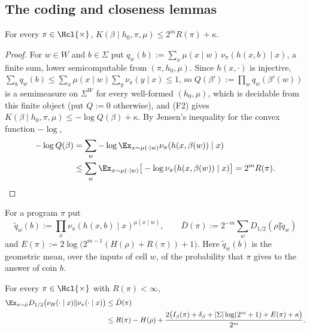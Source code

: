\subsection{The coding and closeness lemmas}\label{app:imit:lemmas}

\begin{lemma}\label{lem:imit:coding}
For every $\pi\in\Hcl{\times}$, $K(\beta\mid h_0,\pi,\mu)\le2^mR(\pi)+\kappa$.
\end{lemma}

\begin{proof}
For $w\in W$ and $b\in\Sigma$ put $q_w(b):=\sum_x\mu(x\mid w)\,\nu_\pi(h(x,b)\mid x)$, a finite sum, lower semicomputable from $(\pi,h_0,\mu)$. Since $h(x,\cdot)$ is injective, $\sum_bq_w(b)\le\sum_x\mu(x\mid w)\sum_y\nu_\pi(y\mid x)\le1$, so $Q(\beta'):=\prod_wq_w(\beta'(w))$ is a semimeasure on $\Sigma^W$ for every well-formed $(h_0,\mu)$, which is decidable from this finite object (put $Q:=0$ otherwise), and (F2) gives $K(\beta\mid h_0,\pi,\mu)\le-\log Q(\beta)+\kappa$. By Jensen's inequality for the convex function $-\log$,
\begin{align*}
-\log Q(\beta)&=\sum_w-\log\Ex_{x\sim\mu(\cdot\mid w)}\nu_\pi(h(x,\beta(w))\mid x)\\
&\le\sum_w\Ex_{x\sim\mu(\cdot\mid w)}\big[-\log\nu_\pi(h(x,\beta(w))\mid x)\big]=2^mR(\pi).\qedhere
\end{align*}
\end{proof}

For a program $\pi$ put
\[
\tilde q_w(b):=\prod_x\nu_\pi(h(x,b)\mid x)^{\mu(x\mid w)},\qquad\bar D(\pi):=2^{-m}\sum_wD_{1/2}(\rho\Vert\tilde q_w)
\]
and $E(\pi):=2\log\big(2^{m-1}(H(\rho)+R(\pi))+1\big)$. Here $\tilde q_w(b)$ is the geometric mean, over the inputs of cell $w$, of the probability that $\pi$ gives to the answer of coin $b$.

\begin{lemma}[Closeness]\label{lem:imit:closeness}
For every $\pi\in\Hcl{\times}$ with $R(\pi)<\infty$,
\begin{align*}
\Ex_{x\sim\bar\mu}D_{1/2}\big(\nu_H(\cdot\mid x)\Vert\nu_\pi(\cdot\mid x)\big)&\le\bar D(\pi)\\
&\le R(\pi)-H(\rho)+\frac{2\big(I_\beta(\pi)+\delta_\beta+|\Sigma|\log(2^m+1)+E(\pi)+\kappa\big)}{2^m}.
\end{align*}
\end{lemma}

